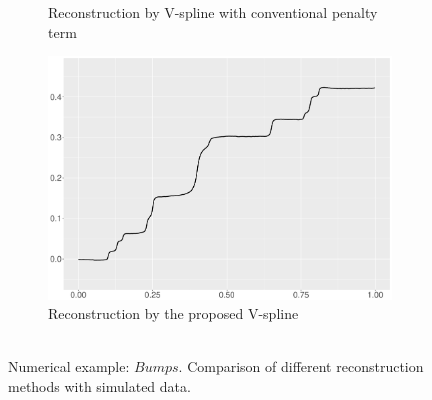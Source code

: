 \begin{figure}
\begin{subfigure}{0.45\textwidth}
    \caption{Reconstruction by V-spline with conventional penalty term}
    \end{subfigure}
    \begin{subfigure}{0.45\textwidth}
    \centering
    \includegraphics[width=\linewidth,height=0.45\textwidth]{Chapters/02TractorSplineTheory/plot/ggplot/ggBumpsTractor.pdf}
    \caption{Reconstruction by the proposed V-spline \\\mbox{  } }
    \end{subfigure}
\caption{Numerical example: $\textit{Bumps}$. Comparison of different reconstruction methods with simulated data.}\label{num2}
 \end{figure}


